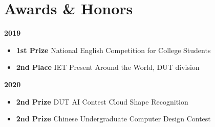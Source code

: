 \documentclass[a4,12pt]{article}
\newcommand{\subtext}[1]{
#1\par\vspace{-0.3cm}}
\newenvironment{zitemize}{
\begin{itemize}\itemsep0pt \parskip0pt \parsep1pt}
{\end{itemize}\vspace{-0.5cm}}
\begin{document}
\section{\textbf{Awards \& Honors}}
\vspace{-0.2cm}
\subtext{\textbf{2019}}
\begin{zitemize}
    \item \textbf{1st Prize} National English Competition for College Students
    \item \textbf{2nd Place} IET Present Around the World, DUT division
\end{zitemize}

\vspace{0.3cm}
\subtext{\textbf{2020}}
\begin{zitemize}
    \item \textbf{2nd Prize} DUT AI Contest Cloud Shape Recognition
    \item \textbf{2nd Prize} Chinese Undergraduate Computer Design Contest
\end{zitemize}


\end{document}

